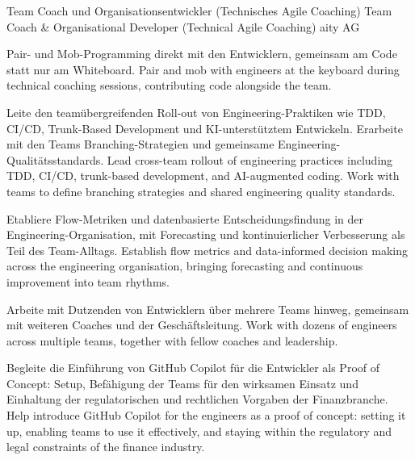 \begin{cventries}
	\cventry
	{
			{Team Coach und Organisationsentwickler (Technisches Agile Coaching)}
			{Team Coach \& Organisational Developer (Technical Agile Coaching)}
	} %
	{aity AG} %
	{} %
	{} %
	{
		\begin{cvitems}
			\item {
				{Pair- und Mob-Programming direkt mit den Entwicklern, gemeinsam am Code statt nur am Whiteboard.}
				{Pair and mob with engineers at the keyboard during technical coaching sessions, contributing code alongside the team.}
			}
			\item {
				{Leite den teamübergreifenden Roll-out von Engineering-Praktiken wie TDD, CI/CD, Trunk-Based Development und KI-unterstütztem Entwickeln. Erarbeite mit den Teams Branching-Strategien und gemeinsame Engineering-Qualitätsstandards.}
				{Lead cross-team rollout of engineering practices including TDD, CI/CD, trunk-based development, and AI-augmented coding. Work with teams to define branching strategies and shared engineering quality standards.}
			}
			\item {
				{Etabliere Flow-Metriken und datenbasierte Entscheidungsfindung in der Engineering-Organisation, mit Forecasting und kontinuierlicher Verbesserung als Teil des Team-Alltags.}
				{Establish flow metrics and data-informed decision making across the engineering organisation, bringing forecasting and continuous improvement into team rhythms.}
			}
			\item {
				{Arbeite mit Dutzenden von Entwicklern über mehrere Teams hinweg, gemeinsam mit weiteren Coaches und der Geschäftsleitung.}
				{Work with dozens of engineers across multiple teams, together with fellow coaches and leadership.}
			}
			\item {
				{Begleite die Einführung von GitHub Copilot für die Entwickler als Proof of Concept: Setup, Befähigung der Teams für den wirksamen Einsatz und Einhaltung der regulatorischen und rechtlichen Vorgaben der Finanzbranche.}
				{Help introduce GitHub Copilot for the engineers as a proof of concept: setting it up, enabling teams to use it effectively, and staying within the regulatory and legal constraints of the finance industry.}
			}
		\end{cvitems}
	}
\end{cventries}

